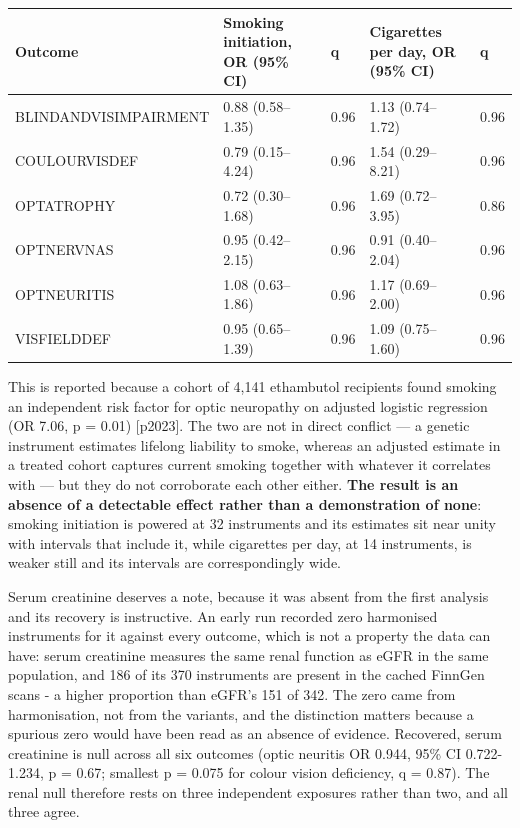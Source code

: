 \documentclass[utf8]{FrontiersinVancouver}
\begin{document}
\begin{table}[htbp]
\centering
\begin{tabular}{lllll}
\hline
Outcome & Smoking initiation, OR (95\% CI) & q & Cigarettes per day, OR (95\% CI) & q \\
\hline
BLINDANDVISIMPAIRMENT & 0.88 (0.58--1.35) & 0.96 & 1.13 (0.74--1.72) & 0.96 \\
COULOURVISDEF & 0.79 (0.15--4.24) & 0.96 & 1.54 (0.29--8.21) & 0.96 \\
OPTATROPHY & 0.72 (0.30--1.68) & 0.96 & 1.69 (0.72--3.95) & 0.86 \\
OPTNERVNAS & 0.95 (0.42--2.15) & 0.96 & 0.91 (0.40--2.04) & 0.96 \\
OPTNEURITIS & 1.08 (0.63--1.86) & 0.96 & 1.17 (0.69--2.00) & 0.96 \\
VISFIELDDEF & 0.95 (0.65--1.39) & 0.96 & 1.09 (0.75--1.60) & 0.96 \\
\hline
\end{tabular}
\end{table}

This is reported because a cohort of 4,141 ethambutol recipients found smoking an independent risk factor for optic neuropathy on adjusted logistic regression (OR 7.06, p = 0.01) [p2023]. The two are not in direct conflict --- a genetic instrument estimates lifelong liability to smoke, whereas an adjusted estimate in a treated cohort captures current smoking together with whatever it correlates with --- but they do not corroborate each other either. \textbf{The result is an absence of a detectable effect rather than a demonstration of none}: smoking initiation is powered at 32 instruments and its estimates sit near unity with intervals that include it, while cigarettes per day, at 14 instruments, is weaker still and its intervals are correspondingly wide.

Serum creatinine deserves a note, because it was absent from the first analysis and its recovery is instructive. An early run recorded zero harmonised instruments for it against every outcome, which is not a property the data can have: serum creatinine measures the same renal function as eGFR in the same population, and 186 of its 370 instruments are present in the cached FinnGen scans - a higher proportion than eGFR's 151 of 342. The zero came from harmonisation, not from the variants, and the distinction matters because a spurious zero would have been read as an absence of evidence. Recovered, serum creatinine is null across all six outcomes (optic neuritis OR 0.944, 95\% CI 0.722-1.234, p = 0.67; smallest p = 0.075 for colour vision deficiency, q = 0.87). The renal null therefore rests on three independent exposures rather than two, and all three agree.
\end{document}
